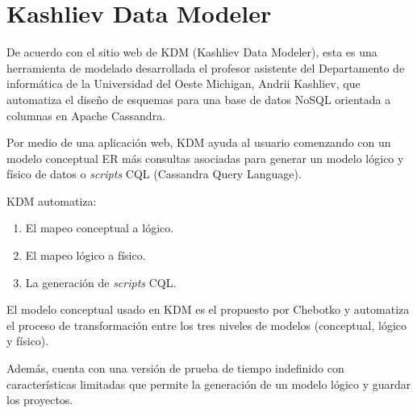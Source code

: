 \section{Kashliev Data Modeler}
De acuerdo con el sitio web de KDM (Kashliev Data Modeler)\cite{datafluent_kashliev_2020}, esta es una herramienta de modelado desarrollada el profesor asistente del Departamento de informática de la Universidad del Oeste Michigan, Andrii Kashliev, que automatiza el diseño de esquemas para una base de datos NoSQL orientada a columnas en Apache Cassandra. 


Por medio de una aplicación web, KDM ayuda al usuario comenzando con un modelo conceptual ER más consultas asociadas para generar un modelo lógico y físico de datos o \textit{scripts} CQL (Cassandra Query Language). 


KDM automatiza: 

\begin{enumerate}
    \item El mapeo conceptual a lógico.
    \item El mapeo lógico a físico.
    \item La generación de \textit{scripts} CQL.
\end{enumerate}

El modelo conceptual usado en KDM es el propuesto por Chebotko\cite{chebotko_big_2015} y automatiza el proceso de transformación entre los tres niveles de modelos (conceptual, lógico y físico).


Además, cuenta con una versión de prueba de tiempo indefinido con características limitadas que permite la generación de un modelo lógico y guardar los proyectos.
